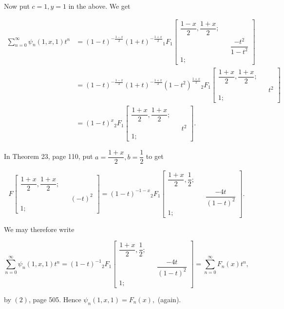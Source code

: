 \begin{solution}
Now put $c=1,y=1$ in the above. We get

$$\begin{array}{ll}
\displaystyle\sum_{n=0}^{\infty} \psi_n(1,x,1) t^n &= (1-t)^{-\frac{1-x}{2}} (1+t)^{-\frac{1+x}{2}} {}_1F_1 \left[ \begin{array}{rlr}
\dfrac{1-x}{2}, \dfrac{1+x}{2}; & & \\
& & \dfrac{-t^2}{1-t^2} \\
1; & &
\end{array} \right] \\
&= (1-t)^{-\frac{1-x}{2}} (1+t)^{-\frac{1+x}{2}} (1-t^2)^{\frac{1+x}{2}} {}_2F_1 \left[ \begin{array}{rlr}
\dfrac{1+x}{2}, \dfrac{1+x}{2}; & & \\
& & t^2 \\
1; & & 
\end{array} \right] \\
&= (1-t)^x {}_2F_1 \left[ \begin{array}{rlr}
\dfrac{1+x}{2}, \dfrac{1+x}{2}; & & \\
& & t^2 \\
1; & & 
\end{array} \right].
\end{array}$$

In Theorem 23, page 110, put $a = \dfrac{1+x}{2}, b=\dfrac{1}{2}$ to get

$$F \left[ \begin{array}{rlr}
\dfrac{1+x}{2}, \dfrac{1+x}{2}; & & \\
& & (-t)^2 \\
1; & &
\end{array} \right] = (1-t)^{-1-x} {}_2F_1 \left[ \begin{array}{rlr}
\dfrac{1+x}{2}, \dfrac{1}{2}; & & \\
& & \dfrac{-4t}{(1-t)^2} \\
1; & &
\end{array} \right].$$

We may therefore write

$$\displaystyle\sum_{n=0}^{\infty} \psi_n(1,x,1) t^n = (1-t)^{-1} {}_2F_1 \left[ \begin{array}{rlr}
\dfrac{1+x}{2}, \dfrac{1}{2}; & & \\
& & \dfrac{-4t}{(1-t)^2} \\
1; & &
\end{array} \right] = \displaystyle\sum_{n=0}^{\infty} F_n(x) t^n,$$

by $(2)$, page 505. Hence $\psi_n(1,x,1) = F_n(x),$ (again).
\end{solution}
